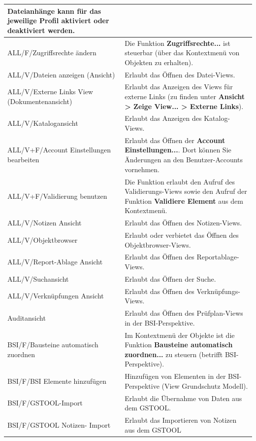 \documentclass[a4paper,10pt]{book}
\begin{document}
\begin{longtable}{| p{5cm} | p{6cm} |}
Dateianhänge kann für das jeweilige Profil aktiviert oder deaktiviert werden.
\\[10pt] \hline
ALL/F/Zugriffsrechte ändern & Die Funktion \textbf{Zugriffsrechte...} ist
steuerbar (über das Kontextmenü von Objekten zu erhalten). \\[10pt] \hline
ALL/V/Dateien anzeigen (Ansicht)& Erlaubt das Öffnen des Datei-Views. \\[10pt]
\hline
ALL/V/Externe Links View (Dokumentenansicht) & Erlaubt das Anzeigen
des Views für externe Links (zu finden unter \textbf{Ansicht > Zeige View... >
Externe Links}). \\[10pt] \hline
ALL/V/Katalogansicht & Erlaubt das Anzeigen des Katalog-Views. \\[10pt] \hline
ALL/V+F/Account Einstellungen bearbeiten & Erlaubt das Öffnen der
\textbf{Account Einstellungen...}. Dort können Sie Änderungen an den
Benutzer-Accounts vornehmen. \\[10pt] \hline
ALL/V+F/Validierung benutzen & Die Funktion erlaubt den Aufruf des
Validierungs-Views sowie den Aufruf der Funktion \textbf{Validiere Element} aus
dem Kontextmenü. \\[10pt] \hline
ALL/V/Notizen Ansicht & Erlaubt das Öffnen des Notizen-Views. \\[10pt] \hline
ALL/V/Objektbrowser & Erlaubt oder verbietet das Öffnen des
Objektbrowser-Views. \\[10pt] \hline
ALL/V/Report-Ablage Ansicht & Erlaubt das Öffnen des Reportablage-Views.
\\[10pt] \hline
ALL/V/Suchansicht & Erlaubt das Öffnen der Suche. \\[10pt] \hline
ALL/V/Verknüpfungen Ansicht & Erlaubt das Öffnen des Verknüpfungs-Views.
\\[10pt] \hline
Auditansicht & Erlaubt das Öffnen des Prüfplan-Views in der BSI-Perspektive.
\\[10pt] \hline
BSI/F/Bausteine automatisch zuordnen & Im Kontextmenü der Objekte ist die
Funktion \textbf{Bausteine automatisch zuordnen...} zu steuern (betrifft
BSI-Perspektive). \\[10pt] \hline
BSI/F/BSI Elemente hinzufügen & Hinzufügen von Elementen in der BSI-Perspektive
(View Grundschutz Modell). \\[10pt] \hline
BSI/F/\textsc{GSTOOL}-Import & Erlaubt die Übernahme von Daten aus dem
\textsc{GSTOOL}. \\[10pt] \hline
BSI/F/\textsc{GSTOOL} Notizen- Import & Erlaubt das Importieren von
Notizen aus dem \textsc{GSTOOL} \\[10pt] \hline

\end{longtable}
\end{document}
